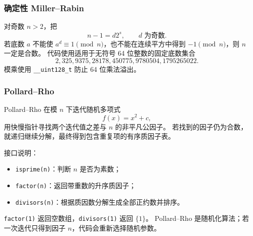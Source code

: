 \subsubsection{确定性 Miller--Rabin}

对奇数 $n>2$，把
\[
  n-1=d2^s,
  \qquad d\text{ 为奇数}.
\]
若底数 $a$ 不能使 $a^d\equiv1\pmod n$，也不能在连续平方中得到 $-1\pmod n$，则 $n$ 一定是合数。
代码使用适用于无符号 64 位整数的固定底数集合
\[
  2,325,9375,28178,450775,9780504,1795265022.
\]
模乘使用 \texttt{\_\_uint128\_t} 防止 64 位乘法溢出。

\subsubsection{Pollard--Rho}

Pollard--Rho 在模 $n$ 下迭代随机多项式
\[
  f(x)=x^2+c,
\]
用快慢指针寻找两个迭代值之差与 $n$ 的非平凡公因子。
若找到的因子仍为合数，就递归继续分解，最终得到包含重复项的有序质因子表。

接口说明：
\begin{itemize}
  \item \texttt{isprime(n)}：判断 $n$ 是否为素数；
  \item \texttt{factor(n)}：返回带重数的升序质因子；
  \item \texttt{divisors(n)}：根据质因数分解生成全部正约数并排序。
\end{itemize}

\begin{icpcwarning}[随机化与边界]
  \texttt{factor(1)} 返回空数组，\texttt{divisors(1)} 返回 $\{1\}$。
  Pollard--Rho 是随机化算法；若一次迭代只得到因子 $n$，代码会重新选择随机参数。
\end{icpcwarning}
